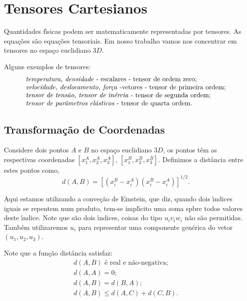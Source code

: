 
\section{Tensores Cartesianos}

Quantidades f\'\i sicas podem ser matematicamente representadas
por tensores. As equa\c{c}\~oes s\~ao equa\c{c}\~oes tensoriais.
Em nosso trabalho vamos nos concentrar em tensores no espa\c{c}o
euclidiano $3D$.

Alguns exemplos de tensores: \[  \begin{array}{l}
               \mbox{\emph{temperatura, densidade} - escalares - tensor de ordem zero}; \\
               \mbox{\emph{velocidade, deslocamento, for\c{c}a} -vetores - tensor de primeira ordem}; \\
               \mbox{\emph{tensor de tens\~ao, tensor de in\'ercia} - tensor de segunda ordem}; \\
               \mbox{\emph{tensor de par\^ametros el\'asticos} -  tensor de quarta ordem}. \\

\end{array}  \]

\subsection{Transforma\c{c}\~ao de Coordenadas}

Considere dois pontos $A$ e $B$ no espa\c{c}o euclidiano $3D$, os
pontos t\^em as respectivas coordenadas $[x_{1}^{A}, x_{2}^{A},
x_{3}^{A}]$, $[x_{1}^{B}, x_{2}^{B}, x_{3}^{B}]$. Definimos a
dist\^ancia entre estes pontos como,
\[d(A,B)=\left[(x_{i}^{B}-x_{i}^{A})(x_{i}^{B}-x_{i}^{A})\right]^{1/2}.\]

Aqui estamos utilizando a conve\c{c}\~ao de Einstein, que diz,
quando dois \'\i ndices iguais se repentem num produto, tem-se
 impl\'\i cito uma soma spbre todos valores deste \'\i ndice.
 Note que s\~ao dois \'\i ndices, coisas do tipo $u_{i}v_{i}w_{i}$ n\~ao s\~ao permitidas.
Tamb\'em utilizaremos $u_{i}$ para representar uma componente gen\'erica do vetor $(u_{1},
u_{2}, u_{3})$.

Note que a fun\c{c}\~ao dist\^ancia satisfaz:
\[  \begin{array}{l}
            d(A,B) \mbox{ \'e real e n\~ao-negativa};\\
            d(A,A)=0;\\
             d(A,B)= d(B,A);\\
             d(A,B) \leq d(A,C)+ d(C,B).
\end{array}  \]


